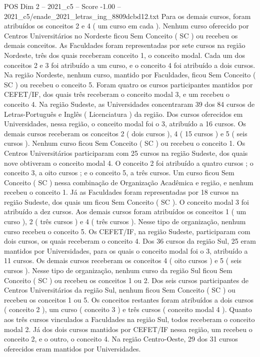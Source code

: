 \begin{textsample}{POS Dim 2 – 2021\_c5 – Score -1.00 – 2021\_c5/enade\_2021\_letras\_ing\_8809dcbd12.txt}
Para os demais cursos, foram atribuídos os conceitos 2 e 4 ( um curso em cada ).
Nenhum curso oferecido por Centros Universitários no Nordeste ficou Sem Conceito ( SC ) ou recebeu os demais conceitos.
As Faculdades foram representadas por sete cursos na região Nordeste, três dos quais receberam conceito 1, o conceito modal.
Cada um dos conceitos 2 e 3 foi atribuído a um curso, e o conceito 4 foi atribuído a dois cursos.
Na região Nordeste, nenhum curso, mantido por Faculdades, ficou Sem Conceito ( SC ) ou recebeu o conceito 5.
Foram quatro os cursos participantes mantidos por CEFET/IF, dos quais três receberam o conceito modal 3, e um recebeu o conceito 4.
Na região Sudeste, as Universidades concentraram 39 dos 84 cursos de Letras-Português e Inglês ( Licenciatura ) da região.
Dos cursos oferecidos em Universidades, nessa região, o conceito modal foi o 3, atribuído a 16 cursos.
Os demais cursos receberam os conceitos 2 ( dois cursos ), 4 ( 15 cursos ) e 5 ( seis cursos ).
Nenhum curso ficou Sem Conceito ( SC ) ou recebeu o conceito 1.
Os Centros Universitários participaram com 25 cursos na região Sudeste, dos quais nove obtiveram o conceito modal 4.
O conceito 2 foi atribuído a quatro cursos ; o conceito 3, a oito cursos ; e o conceito 5, a três cursos.
Um curso ficou Sem Conceito ( SC ) nessa combinação de Organização Acadêmica e região, e nenhum recebeu o conceito 1.
Já as Faculdades foram representadas por 18 cursos na região Sudeste, dos quais um ficou Sem Conceito ( SC ).
O conceito modal 3 foi atribuído a dez cursos.
Aos demais cursos foram atribuídos os conceitos 1 ( um curso ), 2 ( três cursos ) e 4 ( três cursos ).
Nesse tipo de organização, nenhum curso recebeu o conceito 5.
Os CEFET/IF, na região Sudeste, participaram com dois cursos, os quais receberam o conceito 4.
Dos 36 cursos da região Sul, 25 eram mantidos por Universidades, para os quais o conceito modal foi o 3, atribuído a 11 cursos.
Os demais cursos receberam os conceitos 4 ( oito cursos ) e 5 ( seis cursos ).
Nesse tipo de organização, nenhum curso da região Sul ficou Sem Conceito ( SC ) ou recebeu os conceitos 1 ou 2.
Dos seis cursos participantes de Centros Universitários da região Sul, nenhum ficou Sem Conceito ( SC ) ou recebeu os conceitos 1 ou 5.
Os conceitos restantes foram atribuídos a dois cursos ( conceito 2 ), um curso ( conceito 3 ) e três cursos ( conceito modal 4 ).
Quanto aos três cursos vinculados a Faculdades na região Sul, todos receberam o conceito modal 2.
Já dos dois cursos mantidos por CEFET/IF nessa região, um recebeu o conceito 2, e o outro, o conceito 4.
Na região Centro-Oeste, 29 dos 31 cursos oferecidos eram mantidos por Universidades.

\end{textsample}
